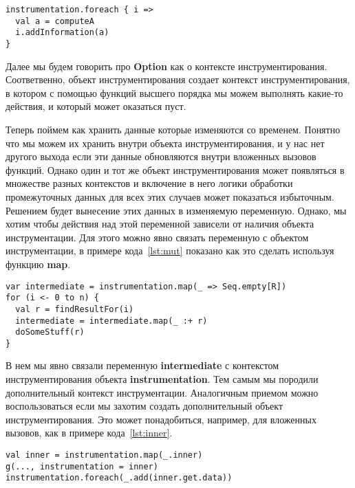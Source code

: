 \begin{samepage}
\begin{lstlisting}[caption={Действия внутри контекста инструментирования},label=lst:ctx]
instrumentation.foreach { i =>
  val a = computeA
  i.addInformation(a)
}
\end{lstlisting}
\end{samepage}

Далее мы будем говорить про \textbf{Option} как о контексте инструментирования.
Соответвенно, объект инструментирования создает контекст инструментирования,
в котором с помощью функций высшего порядка мы можем выполнять какие-то действия,
и который может оказаться пуст.

Теперь поймем как хранить данные которые изменяются со временем.
Понятно что мы можем их хранить внутри объекта инструментирования, и у нас нет другого
выхода если эти данные обновляются внутри вложенных вызовов функций.
Однако один и тот же объект инструментирования может появляться в множестве разных
контекстов и включение в него логики обработки промежуточных данных для
всех этих случаев может показаться избыточным.
Решением будет вынесение этих данных в изменяемую переменную.
Однако, мы хотим чтобы действия над этой переменной зависели от наличия объекта
инструментации.
Для этого можно явно связать переменную с объектом инструментации,
в примере кода~\ref{lst:mut} показано как это сделать используя функцию \textbf{map}.

\begin{samepage}
\begin{lstlisting}[caption={Привязка к контексту инструментирования},label=lst:mut]
var intermediate = instrumentation.map(_ => Seq.empty[R])
for (i <- 0 to n) {
  val r = findResultFor(i)
  intermediate = intermediate.map(_ :+ r)
  doSomeStuff(r)
}
\end{lstlisting}
\end{samepage}

В нем мы явно связали переменную \textbf{intermediate} с контекстом
инструментирования объекта \textbf{instrumentation}.
Тем самым мы породили дополнительный контекст инструментации.
Аналогичным приемом можно воспользоваться если мы захотим создать дополнительный
объект инструментирования.
Это может понадобиться, например, для вложенных вызовов, как в примере
кода~\ref{lst:inner}.

\begin{lstlisting}[caption={Создание нового объекта инструментирования},label=lst:inner]
val inner = instrumentation.map(_.inner)
g(..., instrumentation = inner)
instrumentation.foreach(_.add(inner.get.data))
\end{lstlisting}

